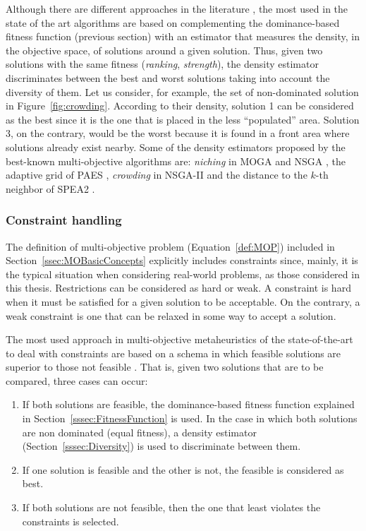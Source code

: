 Although there are different approaches in the literature \cite{coello07evolutionary}, the most used in the state of the art algorithms are based on complementing the dominance-based fitness function (previous section) with an estimator that measures the density, in the objective space, of solutions around a given solution. Thus, given two solutions with the same fitness (\emph{ranking}, \emph{strength}), the density estimator discriminates between the best and worst solutions taking into account the diversity of them. Let us consider, for example, the set of non-dominated solution in Figure~\ref{fig:crowding}. According to their density, solution 1 can be considered as the best since it is the one that is placed in the less ``populated'' area. Solution 3, on the contrary, would be the worst because it is found in a front area where solutions already exist nearby. Some of the density estimators proposed by the best-known multi-objective algorithms are: \emph{niching} in MOGA \cite{fonseca93multiobjective} and NSGA \cite{srinivas94multiobjective}, the adaptive grid of PAES \cite{KC1999}, \emph{crowding} in NSGA-II \cite{deb02fast} and the distance to the $k$-th neighbor of SPEA2 \cite{zitzler01spea2}.

\subsubsection{Constraint handling} 

The definition of multi-objective problem (Equation~\ref{def:MOP}) included in Section~\ref{ssec:MOBasicConcepts} explicitly includes constraints since, mainly, it is the typical situation when considering real-world problems, as those considered in this thesis. Restrictions can be considered as hard or weak. A constraint is hard when it must be satisfied for a given solution to be acceptable. On the contrary, a weak constraint is one that can be relaxed in some way to accept a solution.

The most used approach in multi-objective metaheuristics of the state-of-the-art to deal with constraints are based on a schema in which feasible solutions are superior to those not feasible \cite{deb00efficient,deb01multiobjective}. That is, given two solutions that are to be compared, three cases can occur:

\begin{enumerate}
	\item If both solutions are feasible, the dominance-based fitness function explained in Section~\ref{sssec:FitnessFunction} is used. In the case in which both solutions are non dominated (equal fitness), a density estimator  (Section~\ref{sssec:Diversity}) is used to discriminate between them.
	
	\item If one solution is feasible and the other is not, the feasible is considered as best.

	\item If both solutions are not feasible, then the one that least violates the constraints is selected.
\end{enumerate}

